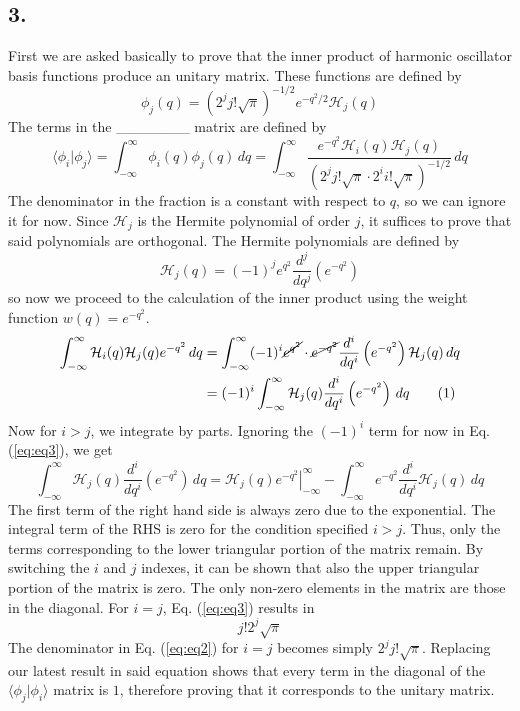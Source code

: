 \documentclass[a4paper, 12pt, notitlepage]{article}
\newcommand\numberthis{\addtocounter{equation}{1}\tag{\theequation}}
\begin{document}
\subsection*{3.}
First we are asked basically to prove that the inner product of harmonic oscillator basis functions produce an unitary matrix. These functions are defined by
\begin{equation}
	\phi_j(q) = \left(2^jj!\sqrt{\pi}\right)^{-1/2}e^{-q^2/2}\mathcal{H}_j(q)\label{eq:eq1}
\end{equation}
The terms in the \_\_\_\_\_\_\_ matrix are defined by
\begin{equation}
	\langle \phi_i|\phi_j \rangle = \int_{-\infty}^{\infty}\phi_i(q)\phi_j(q)\, dq = \int_{-\infty}^{\infty}\frac{e^{-q^2}\mathcal{H}_i(q)\mathcal{H}_j(q)}{\left(2^jj!\sqrt{\pi}\cdot 2^ii!\sqrt{\pi}\right)^{-1/2}}\, dq \label{eq:eq2}
\end{equation}
The denominator in the fraction is a constant with respect to $q$, so we can ignore it for now. Since $\mathcal{H}_j$ is the Hermite polynomial of order $j$, it suffices to prove that said polynomials are orthogonal. The Hermite polynomials are defined by
\begin{equation*}
	\mathcal{H}_j(q) = (-1)^je^{q^2}\frac{d^j}{dq^j}\left(e^{-q^2}\right)
\end{equation*}
so now we proceed to the calculation of the inner product using the weight function $w(q) = e^{-q^2}$.
\begin{align*} \int_{-\infty}^{\infty}\mathcal{H}_i(q)\mathcal{H}_j(q) e^{-q^2}\,dq & = \int_{-\infty}^{\infty}(-1)^i\cancel{e^{q^2}}\cdot \cancel{e^{-q^2}}\frac{d^i}{dq^i}\left(e^{-q^2}\right)\mathcal{H}_j(q)\,dq\\
&= (-1)^i\int_{-\infty}^{\infty}\mathcal{H}_j(q)\frac{d^i}{dq^i}\left(e^{-q^2}\right)\, dq\numberthis\label{eq:eq3}
\end{align*}
Now for $i>j$, we integrate by parts. Ignoring the $(-1)^i$ term for now in Eq. (\ref{eq:eq3}), we get
\begin{equation}
	\int_{-\infty}^\infty\mathcal{H}_j(q)\frac{d^i}{dq^i}\left(e^{-q^2}\right)\, dq = \left.\mathcal{H}_j(q)e^{-q^2}\right|_{-\infty}^{\infty} - \int_{-\infty}^{\infty}e^{-q^2}\frac{d^i}{dq^i}\mathcal{H}_j(q)\, dq\label{eq:eq4}
\end{equation}
The first term of the right hand side is always zero due to the exponential. The integral term of the RHS is zero for the condition specified $i>j$. Thus, only the terms corresponding to the lower triangular portion of the matrix remain. By switching the $i$ and $j$ indexes, it can be shown that also the upper triangular portion of the matrix is zero. The only non-zero elements in the matrix are those in the diagonal. For $i=j$, Eq. (\ref{eq:eq3}) results in
\begin{equation*}
	j!2^j\sqrt{\pi}
\end{equation*}
The denominator in Eq. (\ref{eq:eq2}) for $i = j$ becomes simply $2^jj!\sqrt{\pi}$. Replacing our latest result in said equation shows that every term in the diagonal of the $\langle\phi_j|\phi_i\rangle$ matrix is $1$, therefore proving that it corresponds to the unitary matrix.\\\\
\end{document}
